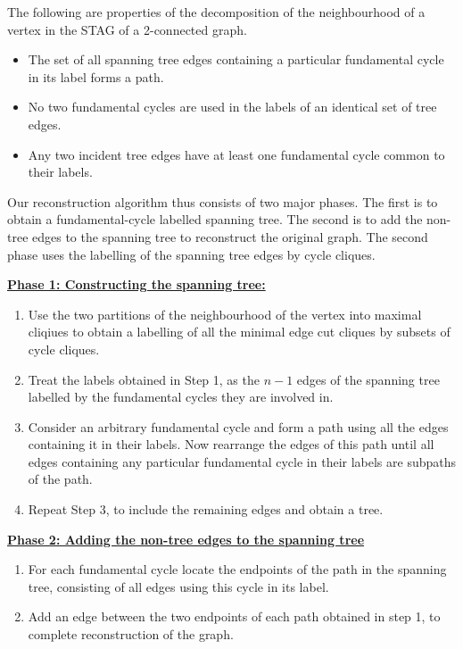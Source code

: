 \documentclass{llncs}
\begin{document}
\begin{lemma}\label{Spanningtreelabels}
	The following are properties of the decomposition of the neighbourhood of a vertex in the STAG of a 2-connected graph.
	\begin{itemize}
		\item The set of all spanning tree edges containing a particular fundamental cycle in its label forms a path.
		\item No two fundamental cycles are used in the labels of an identical set of tree edges.
		\item Any two incident tree edges have at least one fundamental cycle common to their labels.
	\end{itemize} 
\end{lemma}

Our reconstruction algorithm thus consists of two major phases. The first is to obtain a fundamental-cycle labelled spanning tree. The second is to add the non-tree edges to the spanning tree to reconstruct the original graph. The second phase uses the labelling of the spanning tree edges by cycle cliques.


\begin{flushleft}
	{\bf \underline{Phase 1: Constructing the spanning tree:}}
\end{flushleft}
\begin{enumerate}
	\item Use the two partitions of the neighbourhood of the vertex into maximal cliqiues to obtain a labelling of all the minimal edge cut cliques by subsets of cycle cliques. 
	\item Treat the labels obtained in Step 1, as the $n-1$ edges of the spanning tree labelled by the fundamental cycles they are involved in.
	\item Consider an arbitrary fundamental cycle and form a path using all the edges containing it in their labels. Now rearrange the edges of this path until all edges containing any particular fundamental cycle in their labels are subpaths of the path. 
	\item Repeat Step 3, to include the remaining edges and obtain a tree. 
\end{enumerate}
\begin{flushleft}
	{\bf \underline{Phase 2: Adding the non-tree edges to the spanning tree}}
\end{flushleft}
\begin{enumerate}
	\item For each fundamental cycle locate the endpoints of the path in the spanning tree, consisting of all edges using this cycle in its label.
	\item Add an edge between the two endpoints of each path obtained in step 1, to complete reconstruction of the graph.
\end{enumerate}
\end{document}
